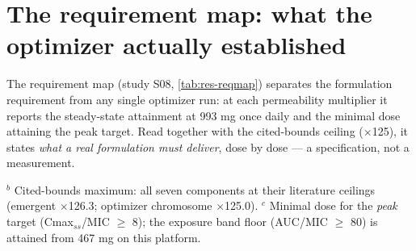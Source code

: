 \section{The requirement map: what the optimizer actually established}
\label{sec:res-reqmap}

The requirement map (study S08, \cref{tab:res-reqmap}) separates the formulation requirement from any single optimizer run: at each permeability multiplier it reports the steady-state attainment at 993 mg once daily and the minimal dose attaining the peak target. Read together with the cited-bounds ceiling ($\times$125), it states \emph{what a real formulation must deliver}, dose by dose --- a specification, not a measurement.

\begin{table}[htbp]
\centering
\caption{Requirement map (S08): steady-state attainment at 993 mg once daily as a function of the permeability multiplier, and the minimal dose attaining the peak target at each multiplier.}
\label{tab:res-reqmap}
{\footnotesize $^{b}$ Cited-bounds maximum: all seven components at their literature ceilings (emergent $\times$126.3; optimizer chromosome $\times$125.0). $^{c}$ Minimal dose for the \emph{peak} target (Cmax$_{ss}$/MIC $\geq$ 8); the exposure band floor (AUC/MIC $\geq$ 80) is attained from 467 mg on this platform.\par}
\end{table}

